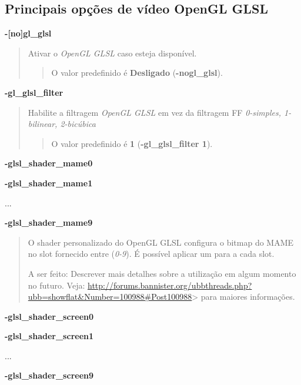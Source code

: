 \documentclass[letterpaper,10pt,brazil]{sphinxmanual}
\begin{document}
\subsection{Principais opções de vídeo OpenGL GLSL}
\label{commandline/commandline-all:principais-opcoes-de-video-opengl-glsl}\label{commandline/commandline-all:mame-commandline-glglsl}
\textbf{-{[}no{]}gl\_glsl}
\begin{quote}

Ativar o \emph{OpenGL GLSL} caso esteja disponível.
\begin{quote}

O valor predefinido é \textbf{Desligado} (\textbf{-nogl\_glsl}).
\end{quote}
\end{quote}
\label{commandline/commandline-all:mame-commandline-glglslfilter}
\textbf{-gl\_glsl\_filter}
\begin{quote}

Habilite a filtragem \emph{OpenGL GLSL} em vez da filtragem FF
\emph{0-simples, 1-bilinear, 2-bicúbica}
\begin{quote}

O valor predefinido é \textbf{1} (\textbf{-gl\_glsl\_filter 1}).
\end{quote}
\end{quote}
\label{commandline/commandline-all:mame-commandline-glslshadermame}
\begin{DUlineblock}{0em}
\item[] \textbf{-glsl\_shader\_mame0}
\item[] \textbf{-glsl\_shader\_mame1}
\item[] ...
\item[] \textbf{-glsl\_shader\_mame9}
\end{DUlineblock}
\begin{quote}

O shader personalizado do OpenGL GLSL configura o bitmap do MAME no
slot fornecido entre (\emph{0-9}). É possível aplicar um para a cada slot.

A ser feito: Descrever mais detalhes sobre a utilização em algum
momento no futuro. Veja:
\url{http://forums.bannister.org/ubbthreads.php?ubb=showflat\&Number=100988\#Post100988}\textgreater{} para maiores informações.
\end{quote}
\label{commandline/commandline-all:mame-commandline-glslshaderscreen}
\begin{DUlineblock}{0em}
\item[] \textbf{-glsl\_shader\_screen0}
\item[] \textbf{-glsl\_shader\_screen1}
\item[] ...
\item[] \textbf{-glsl\_shader\_screen9}
\end{DUlineblock}
\end{document}
